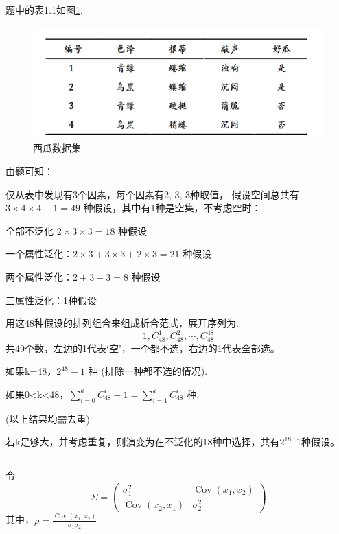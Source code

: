 \documentclass[UTF8,a4paper,AutoFakeBold,AutoFakeSlant]{article}
\begin{document}
\subsection{}
题中的表1.1如图\ref{f2}.
\begin{figure}[htbp]
  \centering
  \includegraphics[scale=0.725]{1_2.png}
  \caption{西瓜数据集}
  \label{f2}
\end{figure}

由题可知：

仅从表中发现有3个因素，每个因素有2, 3, 3种取值，
假设空间总共有 $ 3\times4\times4 + 1 = 49 $ 种假设，其中有1种是空集，不考虑空时：

全部不泛化 $2\times3\times3=18$ 种假设

一个属性泛化：$2\times3+3\times3+2\times3=21$ 种假设

两个属性泛化：$2+3+3=8$ 种假设

三属性泛化：1种假设

用这48种假设的排列组合来组成析合范式，展开序列为:
\begin{equation*}
  1, C_{48}^{1}, C_{48}^{2}, \cdots ,C_{48}^{48}
\end{equation*}
共49个数，左边的1代表‘空’，一个都不选，右边的1代表全部选。

如果k=48，$2^{48} - 1$ 种 (排除一种都不选的情况).

如果0<k<48，$ \sum_{i=0}^k C_{48}^i-1 = \sum_{i=1}^k C_{48}^i $ 种.

(以上结果均需去重)

若k足够大，并考虑重复，则演变为在不泛化的18种中选择，共有$2^{18} – 1$种假设。


\subsection{}
令
\begin{equation*}
  \Sigma =
  \begin{pmatrix}
    \sigma_1^2                  & \operatorname{Cov}(x_1,x_2) \\
    \operatorname{Cov}(x_2,x_1) & \sigma_2^2
  \end{pmatrix}
\end{equation*}
其中，$ \rho = \frac{\operatorname{Cov}(x_1,x_2)}{\sigma_1 \sigma_2} $
\end{document}
